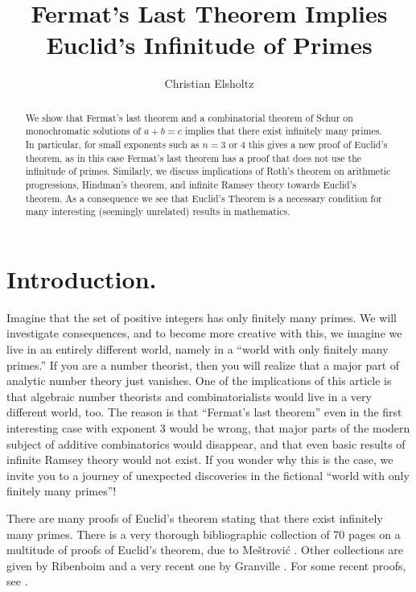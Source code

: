 \documentclass[12pt]{article}
\theoremstyle{theorem}
\theoremstyle{definition}
\begin{document}
\title{
Fermat's Last Theorem Implies\\ Euclid's Infinitude of Primes}
\author{Christian Elsholtz
}
\maketitle



\begin{abstract}
We show that Fermat's last theorem and a combinatorial theorem of Schur on 
monochromatic solutions of $a+b=c$ implies that there exist infinitely 
many primes. In particular, for small exponents such as $n=3$ or $4$ 
this gives a new proof of Euclid's theorem, 
as in this case Fermat's last theorem has a proof that does not use 
the infinitude of primes. Similarly, we discuss implications of
Roth's theorem on arithmetic progressions, Hindman's theorem, and infinite
Ramsey theory towards Euclid's theorem.
As a consequence we see that Euclid's Theorem is a necessary condition for many
interesting (seemingly unrelated) results in mathematics.
\end{abstract}


\section{Introduction.}
Imagine that the set of positive integers has only finitely many primes.
We will investigate consequences, and to become more creative with this, we imagine 
we live in an entirely different world, namely in a ``world with only finitely many primes.''
If you are a number theorist, then you will realize that a major part of analytic number theory
just vanishes. One of the implications of this article is that algebraic
number theorists and combinatorialists would live in a very different 
world, too.
The reason is that ``Fermat's last theorem'' even in the first interesting case 
with exponent $3$ would be wrong, that major parts of the modern subject of
additive combinatorics would disappear,
and that even basic results of infinite Ramsey theory would not exist. 
If you wonder why
this is the case, we invite you to a journey
of unexpected discoveries in the 
fictional ``world with only finitely many primes''!



 There are many proofs of Euclid's theorem stating that there exist
infinitely many primes. 
There is a very thorough bibliographic collection of 70 pages on a multitude of proofs of Euclid's theorem,
due to Me\v{s}trovi\'{c} \cite{Mestrovic}. 
Other collections are given by Ribenboim \cite{Ribenboim} 
and a very recent one by Granville \cite{GranvilleLMS}. 
For some recent proofs, see \cite{Saidak:2006, Wooley}.
\end{document}
